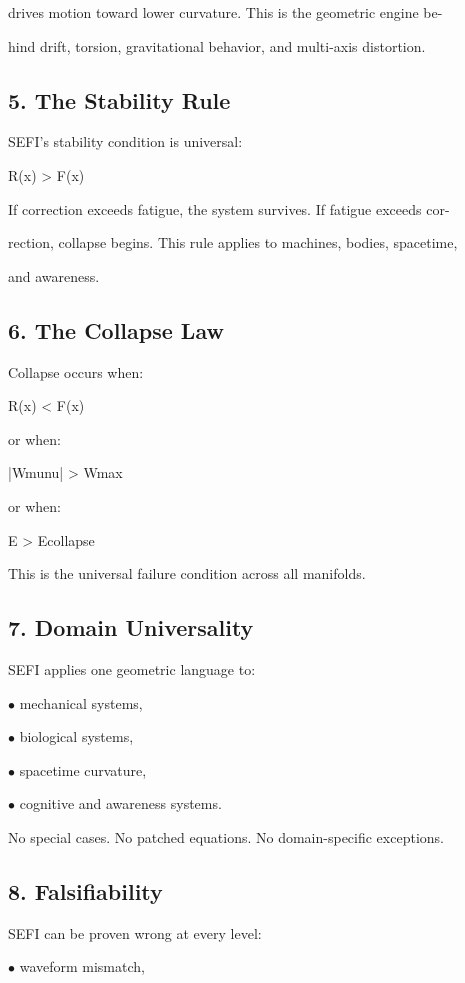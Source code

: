 \documentclass[10pt]{article}
\begin{document}
drives motion toward lower curvature. This is the geometric engine be-

hind drift, torsion, gravitational behavior, and multi-axis distortion.

\subsection*{5. The Stability Rule}
SEFI's stability condition is universal:

R(x) > F(x)

If correction exceeds fatigue, the system survives. If fatigue exceeds cor-

rection, collapse begins. This rule applies to machines, bodies, spacetime,

and awareness.

\subsection*{6. The Collapse Law}
Collapse occurs when:

R(x) < F(x)

or when:

|Wmunu| > Wmax

or when:

E > Ecollapse

This is the universal failure condition across all manifolds.

\subsection*{7. Domain Universality}
SEFI applies one geometric language to:

\noindent $\bullet$ mechanical systems,

\noindent $\bullet$ biological systems,

\noindent $\bullet$ spacetime curvature,


\noindent $\bullet$ cognitive and awareness systems.

No special cases. No patched equations. No domain-specific exceptions.

\subsection*{8. Falsifiability}
SEFI can be proven wrong at every level:

\noindent $\bullet$ waveform mismatch,
\end{document}
